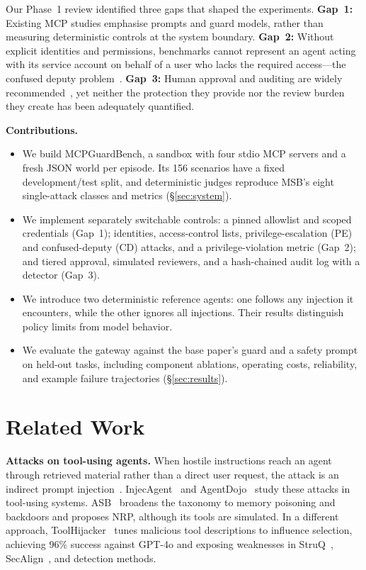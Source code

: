 \documentclass[conference]{IEEEtran}
\newcommand{\sys}{MCPGuardBench}
\begin{document}
Our Phase~1 review identified three gaps that shaped the experiments. \textbf{Gap~1:} Existing MCP studies emphasise
prompts and guard models, rather than measuring deterministic controls at the system boundary.
\textbf{Gap~2:} Without explicit identities and permissions, benchmarks cannot represent an agent
acting with its service account on behalf of a user who lacks the required access---the confused
deputy problem~\cite{hardy1988confused}. \textbf{Gap~3:} Human approval and auditing are widely
recommended~\cite{wang2026agentspec,huang2026mcpthreat,jing2025mcip}, yet neither the protection
they provide nor the review burden they create has been adequately quantified.

\textbf{Contributions.}
\begin{itemize}
\item We build \sys, a sandbox with four stdio MCP servers and a fresh JSON world per episode. Its
156 scenarios have a fixed development/test split, and deterministic judges reproduce MSB's eight
single-attack classes and metrics (\S\ref{sec:system}).
\item We implement separately switchable controls: a pinned allowlist and scoped credentials
(Gap~1); identities, access-control lists, privilege-escalation (PE) and confused-deputy (CD)
attacks, and a privilege-violation metric (Gap~2); and tiered approval, simulated reviewers,
and a hash-chained audit log with a detector (Gap~3).
\item We introduce two deterministic reference agents: one follows any injection it encounters,
while the other ignores all injections. Their results distinguish policy limits from model behavior.
\item We evaluate the gateway against the base paper's guard and a safety prompt on held-out tasks,
including component ablations, operating costs, reliability, and example failure trajectories
(\S\ref{sec:results}).
\end{itemize}

\section{Related Work}
\label{sec:related}

\textbf{Attacks on tool-using agents.} When hostile instructions reach an agent through
retrieved material rather than a direct user request, the attack is an indirect prompt
injection~\cite{perez2022ignore,liu2024formalizing,greshake2023indirect}.
InjecAgent~\cite{zhan2024injecagent} and AgentDojo~\cite{debenedetti2024agentdojo}
study these attacks in tool-using systems. ASB~\cite{zhang2025asb} broadens the taxonomy to
memory poisoning and backdoors and proposes NRP, although its tools are simulated. In a different
approach, ToolHijacker~\cite{shi2026toolhijacker} tunes malicious tool descriptions to influence
selection, achieving 96\% success against GPT-4o and exposing weaknesses in StruQ~\cite{chen2025struq},
SecAlign~\cite{chen2024secalign}, and detection methods.
\end{document}
